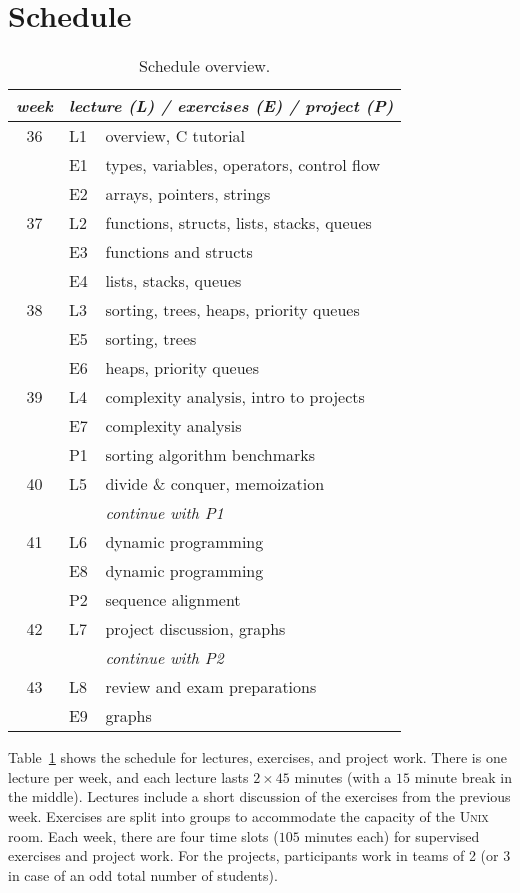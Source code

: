 \documentclass[a4paper]{article}
\begin{document}
\section{Schedule}

\begin{table}
  \centering
  \begin{tabular}{|cll|}
    \hline
    \emph{week} & \multicolumn{2}{l|}{\emph{lecture (L) / exercises (E) / project (P)}} \\
    \hline
    36 & L1 & overview, C tutorial \\
       & E1 & types, variables, operators, control flow \\
       & E2 & arrays, pointers, strings \\
    \hline
    37 & L2 & functions, structs, lists, stacks, queues \\
       & E3 & functions and structs \\
       & E4 & lists, stacks, queues  \\
    \hline
    38 & L3 & sorting, trees, heaps, priority queues \\
       & E5 & sorting, trees \\
       & E6 & heaps, priority queues \\
    \hline
    39 & L4 & complexity analysis, intro to projects \\
       & E7 & complexity analysis \\
       & P1 & sorting algorithm benchmarks \\
    \hline
    40 & L5 & divide \& conquer, memoization \\
       &    & \emph{continue with P1} \\
    \hline
    41 & L6 & dynamic programming \\
       & E8 & dynamic programming \\
       & P2 & sequence alignment \\
    \hline
    42 & L7 & project discussion, graphs \\
       &    & \emph{continue with P2} \\
    \hline
    43 & L8 & review and exam preparations \\
       & E9 & graphs \\
    \hline
  \end{tabular}
  \caption{Schedule overview.}\label{tab:schedule}
\end{table}

Table~\ref{tab:schedule} shows the schedule for lectures, exercises, and project work.
There is one lecture per week, and each lecture lasts $2\times 45$ minutes (with a $15$ minute break in the middle).
Lectures include a short discussion of the exercises from the previous week.
Exercises are split into groups to accommodate the capacity of the \textsc{Unix} room.
Each week, there are four time slots ($105$ minutes each) for supervised exercises and project work.
For the projects, participants work in teams of 2 (or 3 in case of an odd total number of students).
\end{document}
